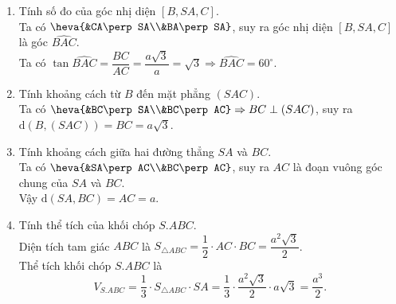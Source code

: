\begin{bt}
{\begin{enumerate}
	Vậy $\widehat{SCA}=60^\circ$.
	\item Tính số đo của góc nhị diện $[B,SA,C]$.\\
	Ta có $\heva{&CA\perp SA\\&BA\perp SA}$, suy ra góc nhị diện $[B,SA,C]$ là góc $\widehat{BAC}$.\\
	Ta có $\tan \widehat{BAC}=\dfrac{BC}{AC}=\dfrac{a\sqrt{3}}{a}=\sqrt{3}\Rightarrow \widehat{BAC}=60^\circ$.
	\item Tính khoảng cách từ $B$ đến mặt phẳng $(SAC)$.\\
	Ta có $\heva{&BC\perp SA\\&BC\perp AC}\Rightarrow BC\perp (SAC)$, suy ra $\mathrm{d}(B,(SAC))=BC=a\sqrt{3}$.
	\item Tính khoảng cách giữa hai đường thẳng $SA$ và $BC$.\\
	Ta có $\heva{&SA\perp AC\\&BC\perp AC}$, suy ra $AC$ là đoạn vuông góc chung của $SA$ và $BC$.\\
	Vậy $\mathrm{d}(SA,BC)=AC=a$.
	\item Tính thể tích của khối chóp $S.ABC$.\\
	Diện tích tam giác $ABC$ là $S_{\triangle {ABC}}=\dfrac{1}{2}\cdot AC\cdot BC=\dfrac{a^2\sqrt{3}}{2}$.\\
	Thể tích khối chóp $S.ABC$ là $$V_{S.ABC}=\dfrac{1}{3}\cdot S_{\triangle {ABC}}\cdot SA=\dfrac{1}{3}\cdot \dfrac{a^2\sqrt{3}}{2}\cdot a\sqrt{3}=\dfrac{a^3}{2}.$$
	\end{enumerate}
	}
\end{bt}
